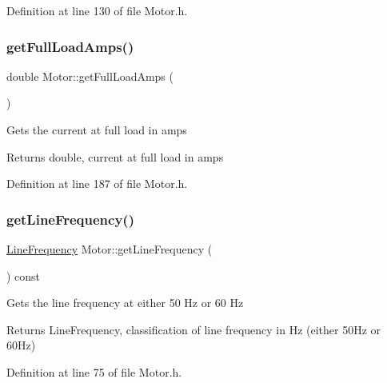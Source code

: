 Definition at line 130 of file Motor.\+h.

\mbox{\label{class_motor_a612eb0dabb9623ee8e0866046527d16a}} 
\subsubsection{\texorpdfstring{get\+Full\+Load\+Amps()}{getFullLoadAmps()}}
{\footnotesize\ttfamily double Motor\+::get\+Full\+Load\+Amps (\begin{DoxyParamCaption}{ }\end{DoxyParamCaption})\hspace{0.3cm}{\ttfamily [inline]}}

Gets the current at full load in amps

\begin{DoxyReturn}{Returns}
double, current at full load in amps 
\end{DoxyReturn}


Definition at line 187 of file Motor.\+h.

\mbox{\label{class_motor_a41e71462fe60674a5554e47d0079b0f3}} 
\subsubsection{\texorpdfstring{get\+Line\+Frequency()}{getLineFrequency()}}
{\footnotesize\ttfamily \hyperlink{class_motor_acee1bdf1b684ad36cb80dc2829d9fcee}{Line\+Frequency} Motor\+::get\+Line\+Frequency (\begin{DoxyParamCaption}{ }\end{DoxyParamCaption}) const\hspace{0.3cm}{\ttfamily [inline]}}

Gets the line frequency at either 50 Hz or 60 Hz

\begin{DoxyReturn}{Returns}
Line\+Frequency, classification of line frequency in Hz (either 50\+Hz or 60\+Hz) 
\end{DoxyReturn}


Definition at line 75 of file Motor.\+h.

\mbox{\label{class_motor_a476d3790492959945b3b75d1638f737f}} 
